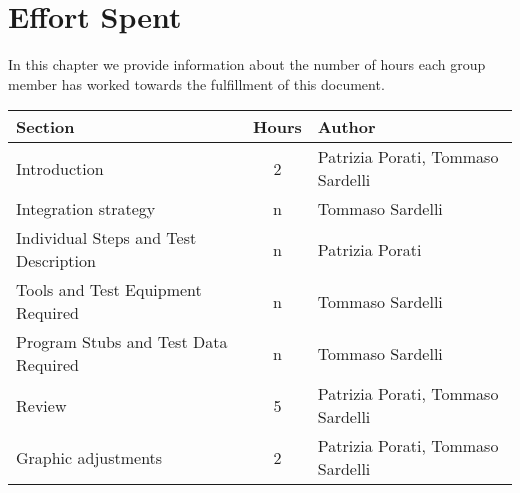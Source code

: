 \pagebreak
\section{Effort Spent}

In this chapter we provide information about the number of hours each group member has worked towards the fulfillment of this document.

\begin{center}
	\vspace{0.2cm}
	\begin{tabular}{ l c l } 
		\hline
		Section 					& Hours & Author \\ 
		\hline
		Introduction								& 2 	& Patrizia Porati, Tommaso Sardelli	\\
		Integration strategy						& n 	& Tommaso Sardelli	\\
		Individual Steps and Test Description 		& n 	& Patrizia Porati \\ 
		Tools and Test Equipment Required 			& n	 	& Tommaso Sardelli \\
		Program Stubs and Test Data Required		& n		& Tommaso Sardelli \\
		Review										& 5		& Patrizia Porati, Tommaso Sardelli	\\
		Graphic adjustments     				    & 2		& Patrizia Porati, Tommaso Sardelli	\\
		\hline
	\end{tabular}
\end{center}
